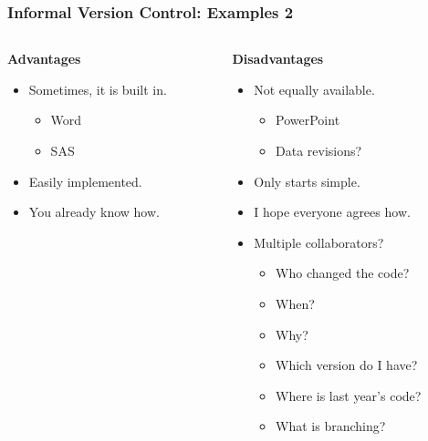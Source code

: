 \documentclass{beamer}
\begin{document}
\begin{frame} %
  \frametitle{Informal Version Control: Examples 2}
  \begin{columns}[t]
    \begin{column}{.5\textwidth}
      \textbf{{\large Advantages}}
      \begin{itemize}
      \item Sometimes, it is built in.
        \begin{itemize}
        \item Word
        \item SAS
        \end{itemize}
      \item Easily implemented.
      \item You already know how.
      \end{itemize}
    \end{column}
    
    \begin{column}{.5\textwidth}
      \textbf{{\large Disadvantages}}
      \begin{itemize}
      \item Not equally available.
        \begin{itemize}
        \item PowerPoint
        \item Data revisions?
        \end{itemize}
      \item Only starts simple.
      \item I hope everyone agrees how.
      \item Multiple collaborators?
        \begin{itemize}
        \item Who changed the code?
        \item When?  
        \item Why?
        \item Which version do I have?
        \item Where is last year's code?
        \item What is branching?
        \end{itemize}
      \end{itemize}
    \end{column}
  \end{columns}
\end{frame}
\end{document}
